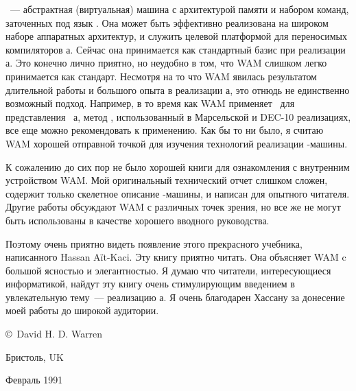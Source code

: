 \ --- абстрактная (виртуальная) машина с архитектурой памяти и набором
команд, заточенных под язык \prolog. Она может быть эффективно реализована на
широком наборе аппаратных архитектур, и служить целевой платформой для
переносимых компиляторов \prolog а. Сейчас она принимается как стандартный базис
при реализации \prolog а. Это конечно лично приятно, но неудобно в том, что WAM
слишком легко принимается как стандарт. Несмотря на то что WAM явилась
результатом длительной работы и большого опыта в реализации \prolog а, это
отнюдь не единственно возможный подход. Например, в то время как WAM применяет
\ для представления
\ \prolog а, метод , использованный в Марсельской и DEC-10 реализациях, все еще можно
рекомендовать к применению. Как бы то ни было, я считаю WAM хорошей отправной
точкой для изучения технологий реализации \prolog-машины.

К сожалению до сих пор не было хорошей книги для ознакомления с внутренним
устройством WAM. Мой оригинальный технический отчет слишком сложен, содержит
только скелетное описание \prolog-машины, и написан для опытного читателя.
Другие работы обсуждают WAM с различных точек зрения, но все же не могут быть
использованы в качестве хорошего вводного руководства.

Поэтому очень приятно видеть появление этого прекрасного учебника, написанного
Hassan A\"it-Kaci. Эту книгу приятно читать. Она объясняет WAM c большой
ясностью и элегантностью. Я думаю что читатели, интересующиеся информатикой,
найдут эту книгу очень стимулирующим введением в увлекательную тему\ ---
реализацию \prolog а. Я очень благодарен Хассану за донесение моей работы до
широкой аудитории.

\bigskip
\copyright\ David H. D. Warren

Бристоль, UK

Февраль 1991










\secup







\secup
